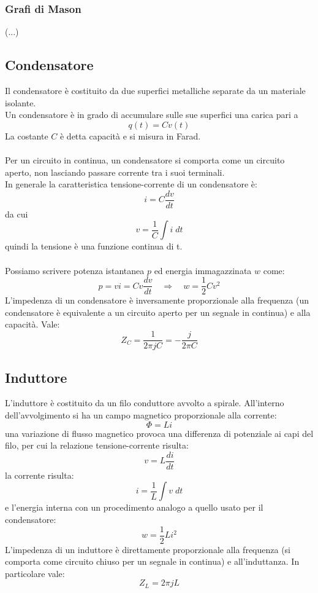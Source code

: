 \documentclass{article}
\begin{document}
\subsubsection{Grafi di Mason}
(...)


\subsection{Condensatore}
Il condensatore è costituito da due superfici metalliche separate da un materiale isolante.\\
Un condensatore è in grado di accumulare sulle sue superfici una carica pari a
$$ q(t)=Cv(t) $$
La costante $C$ è detta capacità e si misura in Farad.\\\\
Per un circuito in continua, un condensatore si comporta come un circuito aperto, non lasciando passare corrente tra i suoi terminali.\\
In generale la caratteristica tensione-corrente di un condensatore è:
$$ i=C\frac{dv}{dt} $$
da cui
$$ v=\frac{1}{C}\int i\;dt $$
quindi la tensione è una funzione continua di t.\\\\
Possiamo scrivere potenza istantanea $p$ ed energia immagazzinata $w$ come:
$$ p=vi=Cv\frac{dv}{dt} \quad\Rightarrow\quad w=\frac{1}{2}Cv^2 $$
L'impedenza di un condensatore è inversamente proporzionale alla frequenza (un condensatore è equivalente a un circuito aperto per un segnale in continua) e alla capacità. Vale:
$$ Z_C = \frac{1}{2\pi j C} = -\frac{j}{2\pi C} $$

\subsection{Induttore}
L'induttore è costituito da un filo conduttore avvolto a spirale. All'interno dell'avvolgimento si ha un campo magnetico proporzionale alla corrente:
$$ \Phi=Li $$
una variazione di flusso magnetico provoca una differenza di potenziale ai capi del filo, per cui la relazione tensione-corrente risulta:
$$ v=L\frac{di}{dt} $$
la corrente risulta:
$$ i=\frac{1}{L}\int v\;dt $$
e l'energia interna con un procedimento analogo a quello usato per il condensatore:
$$ w=\frac{1}{2}Li^2 $$
L'impedenza di un induttore è direttamente proporzionale alla frequenza (si comporta come circuito chiuso per un segnale in continua) e all'induttanza. In particolare vale:
$$ Z_L=2\pi j L $$
\end{document}
